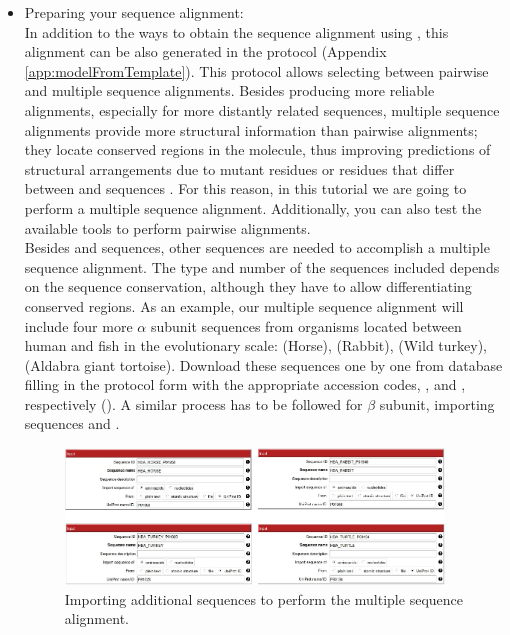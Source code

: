  \begin{itemize}
 \item Preparing your sequence alignment:\\
In addition to the ways to obtain the  sequence alignment using \chimera, this alignment can be also generated in the \scipion protocol  (Appendix \ref{app:modelFromTemplate}). This protocol allows selecting between pairwise and multiple sequence alignments. Besides producing more reliable alignments, especially for more distantly related sequences, multiple sequence alignments provide more structural information than pairwise alignments; they locate conserved regions in the molecule, thus improving predictions of structural arrangements due to mutant residues or residues that differ between  and  sequences \citep{pearson2013}. For this reason, in this tutorial we are going to perform a multiple sequence alignment. Additionally, you can also test the available tools to perform pairwise alignments.\\
 
Besides  and  sequences, other sequences are needed to accomplish a multiple sequence alignment. The type and number of the sequences included depends on the sequence conservation, although they have to allow differentiating conserved regions. As an example, our multiple sequence alignment will include four more  $\alpha$ subunit sequences from organisms located between human and fish in the evolutionary scale:  (Horse),  (Rabbit),  (Wild turkey),  (Aldabra giant tortoise). Download these sequences one by one from  database filling in the  protocol form with the appropriate accession codes, , and , respectively (). A similar process has to be followed for  $\beta$ subunit, importing  sequences  and .

  \begin{figure}[H]
  \centering 
  \captionsetup{width=.9\linewidth} 
  \includegraphics[width=0.95\textwidth]{Images/Fig12}
  \caption{Importing additional sequences to perform the multiple sequence alignment.}
  \label{fig:multialignment_sequences}
  \end{figure}


\end{itemize}
